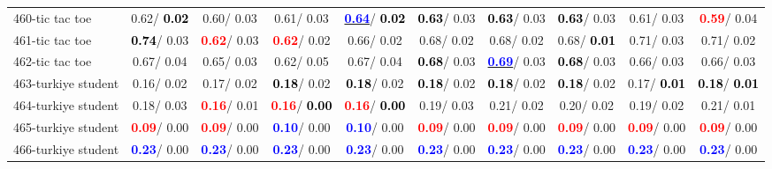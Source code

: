 \begin{table}[h]
\begin{center}
{\begin{tabular}{lc|c|c|c|c|c|c|c|c}
460-tic tac toe &   0.62/\textcolor{black}{\textbf{  0.02}} &   0.60/  0.03 &   0.61/  0.03 & \underline{\textcolor{blue}{\textbf{  0.64}}}/\textcolor{black}{\textbf{  0.02}} & \textcolor{black}{\textbf{  0.63}}/  0.03 & \textcolor{black}{\textbf{  0.63}}/  0.03 & \textcolor{black}{\textbf{  0.63}}/  0.03 &   0.61/  0.03 & \textcolor{red}{\textbf{  0.59}}/  0.04 \\
461-tic tac toe & \textcolor{black}{\textbf{  0.74}}/  0.03 & \textcolor{red}{\textbf{  0.62}}/  0.03 & \textcolor{red}{\textbf{  0.62}}/  0.02 &   0.66/  0.02 &   0.68/  0.02 &   0.68/  0.02 &   0.68/\textcolor{black}{\textbf{  0.01}} &   0.71/  0.03 &   0.71/  0.02 \\
462-tic tac toe &   0.67/  0.04 &   0.65/  0.03 &   0.62/  0.05 &   0.67/  0.04 & \textcolor{black}{\textbf{  0.68}}/  0.03 & \underline{\textcolor{blue}{\textbf{  0.69}}}/  0.03 & \textcolor{black}{\textbf{  0.68}}/  0.03 &   0.66/  0.03 &   0.66/  0.03 \\ \hline
463-turkiye student &   0.16/  0.02 &   0.17/  0.02 & \textcolor{black}{\textbf{  0.18}}/  0.02 & \textcolor{black}{\textbf{  0.18}}/  0.02 & \textcolor{black}{\textbf{  0.18}}/  0.02 & \textcolor{black}{\textbf{  0.18}}/  0.02 & \textcolor{black}{\textbf{  0.18}}/  0.02 &   0.17/\textcolor{black}{\textbf{  0.01}} & \textcolor{black}{\textbf{  0.18}}/\textcolor{black}{\textbf{  0.01}} \\
464-turkiye student &   0.18/  0.03 & \textcolor{red}{\textbf{  0.16}}/  0.01 & \textcolor{red}{\textbf{  0.16}}/\textcolor{black}{\textbf{  0.00}} & \textcolor{red}{\textbf{  0.16}}/\textcolor{black}{\textbf{  0.00}} &   0.19/  0.03 &   0.21/  0.02 &   0.20/  0.02 &   0.19/  0.02 &   0.21/  0.01 \\
465-turkiye student & \textcolor{red}{\textbf{  0.09}}/  0.00 & \textcolor{red}{\textbf{  0.09}}/  0.00 & \textcolor{blue}{\textbf{  0.10}}/  0.00 & \textcolor{blue}{\textbf{  0.10}}/  0.00 & \textcolor{red}{\textbf{  0.09}}/  0.00 & \textcolor{red}{\textbf{  0.09}}/  0.00 & \textcolor{red}{\textbf{  0.09}}/  0.00 & \textcolor{red}{\textbf{  0.09}}/  0.00 & \textcolor{red}{\textbf{  0.09}}/  0.00 \\
466-turkiye student & \textcolor{blue}{\textbf{  0.23}}/  0.00 & \textcolor{blue}{\textbf{  0.23}}/  0.00 & \textcolor{blue}{\textbf{  0.23}}/  0.00 & \textcolor{blue}{\textbf{  0.23}}/  0.00 & \textcolor{blue}{\textbf{  0.23}}/  0.00 & \textcolor{blue}{\textbf{  0.23}}/  0.00 & \textcolor{blue}{\textbf{  0.23}}/  0.00 & \textcolor{blue}{\textbf{  0.23}}/  0.00 & \textcolor{blue}{\textbf{  0.23}}/  0.00 \\

\end{tabular}}
\end{center}
\end{table}
